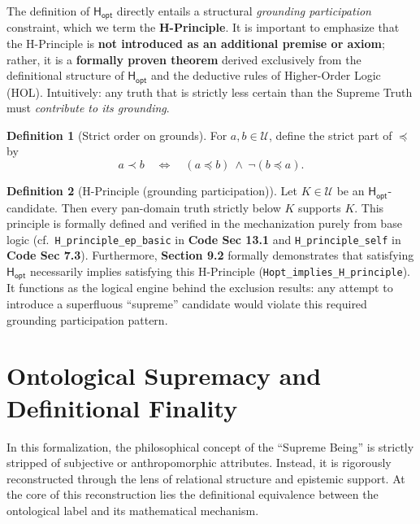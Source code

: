\documentclass[a4paper, 11pt]{article}
\theoremstyle{plain}
\theoremstyle{definition}
\newtheorem{definition}{Definition}[section]
\newcommand{\U}{\mathcal{U}}               %
\newcommand{\Hopt}{\mathsf{H_{opt}}}       %
\begin{document}
\noindent
The definition of $\Hopt$ directly entails a structural \emph{grounding participation} constraint, which we term the \textbf{H-Principle}.
It is important to emphasize that the H-Principle is \textbf{not introduced as an additional premise or axiom}; rather, it is a \textbf{formally proven theorem} derived exclusively from the definitional structure of $\Hopt$ and the deductive rules of Higher-Order Logic (HOL).
Intuitively: any truth that is strictly less certain than the Supreme Truth must \emph{contribute to its grounding}.

\begin{definition}[Strict order on grounds]
For $a,b\in\U$, define the strict part of $\preceq$ by
\[
a \prec b \quad \Longleftrightarrow \quad (a \preceq b)\ \land\ \neg(b \preceq a).
\]
\end{definition}

\begin{definition}[H-Principle (grounding participation)]
Let $K\in\U$ be an $\Hopt$-candidate. Then every pan-domain truth strictly below $K$ supports $K$.
This principle is formally defined and verified in the mechanization purely from base logic (cf.\ \texttt{H\_principle\_ep\_basic} in \textbf{Code Sec 13.1} and \texttt{H\_principle\_self} in \textbf{Code Sec 7.3}). Furthermore, \textbf{Section 9.2} formally demonstrates that satisfying $\Hopt$ necessarily implies satisfying this H-Principle (\texttt{Hopt\_implies\_H\_principle}).
It functions as the logical engine behind the exclusion results: any attempt to introduce a superfluous ``supreme'' candidate would violate this required grounding participation pattern.
\end{definition}

\section{Ontological Supremacy and Definitional Finality}

In this formalization, the philosophical concept of the ``Supreme Being'' is strictly stripped of subjective or anthropomorphic attributes. Instead, it is rigorously reconstructed through the lens of relational structure and epistemic support. At the core of this reconstruction lies the definitional equivalence between the ontological label and its mathematical mechanism.
\end{document}
